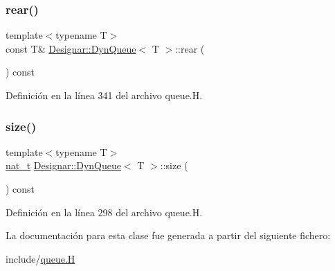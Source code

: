 \subsubsection{\texorpdfstring{rear()}{rear()}\hspace{0.1cm}{\footnotesize\ttfamily [2/2]}}
{\footnotesize\ttfamily template$<$typename T$>$ \\
const T\& \hyperlink{class_designar_1_1_dyn_queue}{Designar\+::\+Dyn\+Queue}$<$ T $>$\+::rear (\begin{DoxyParamCaption}{ }\end{DoxyParamCaption}) const\hspace{0.3cm}{\ttfamily [inline]}}



Definición en la línea 341 del archivo queue.\+H.

\mbox{\label{class_designar_1_1_dyn_queue_a3fa0e8fd7d197de1a60caae23b5c305e}} 
\subsubsection{\texorpdfstring{size()}{size()}}
{\footnotesize\ttfamily template$<$typename T$>$ \\
\hyperlink{namespace_designar_aa72662848b9f4815e7bf31a7cf3e33d1}{nat\+\_\+t} \hyperlink{class_designar_1_1_dyn_queue}{Designar\+::\+Dyn\+Queue}$<$ T $>$\+::size (\begin{DoxyParamCaption}{ }\end{DoxyParamCaption}) const\hspace{0.3cm}{\ttfamily [inline]}}



Definición en la línea 298 del archivo queue.\+H.



La documentación para esta clase fue generada a partir del siguiente fichero\+:\begin{DoxyCompactItemize}
\item 
include/\hyperlink{queue_8_h}{queue.\+H}\end{DoxyCompactItemize}
